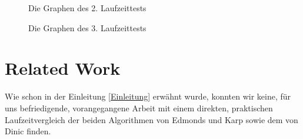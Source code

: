 \documentclass[a4paper]{llncs}
\begin{document}
\begin{figure}
\label{fig:testgraph2}
\caption{Die Graphen des 2. Laufzeittests} 
\end{figure}

\begin{figure}[H]
\label{fig:testgraph3}
\caption{Die Graphen des 3. Laufzeittests} 
\end{figure}

\citep{FordFulkOnline}

\section{Related Work}
\label{Related Work}
Wie schon in der Einleitung \ref{Einleitung} erwähnt wurde, konnten wir keine, für uns befriedigende, vorangegangene Arbeit mit einem direkten, praktischen Laufzeitvergleich der beiden Algorithmen von Edmonds und Karp sowie dem von Dinic finden.
\end{document}
